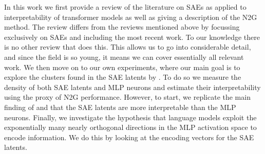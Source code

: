 In this work we first provide a review of the literature on SAEs as applied to interpretability of transformer models as well as giving a description of the N2G method.
The review differs from the reviews mentioned above by focussing exclusively on SAEs and including the most recent work.
To our knowledge there is no other review that does this.
This allows us to go into considerable detail, and since the field is so young, it means we can cover essentially all relevant work.
We then move on to our own experiments, where our main goal is to explore the clusters found in the SAE latents by \textcite{bricken_towards_2023}.
To do so we measure the density of both SAE latents and MLP neurons and estimate their interpretability using the proxy of N2G performance.
However, to start, we replicate the main finding of \textcite{bricken_towards_2023} and \textcite{cunningham_sparse_2023} that the SAE latents are more interpretable than the MLP neurons.
Finally, we investigate the hypothesis that language models exploit the exponentially many nearly orthogonal directions in the MLP activation space to encode information.
We do this by looking at the encoding vectors for the SAE latents.
